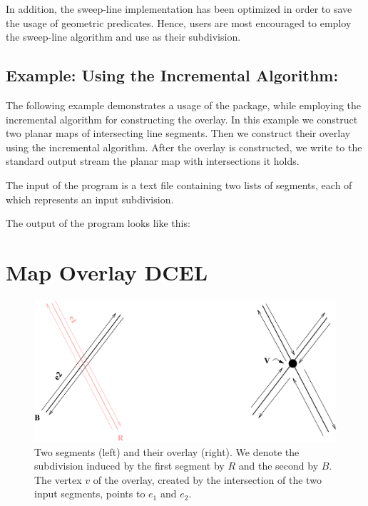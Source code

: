 In addition, the sweep-line implementation has been optimized in order to
save the usage of geometric predicates. 
Hence, users are most encouraged to employ the sweep-line algorithm 
and use  as their subdivision. 

\subsection*{Example: Using the Incremental Algorithm:}
The following example demonstrates a usage of the 
 package, 
while employing the incremental algorithm for constructing the overlay.
In this example we construct two planar maps of intersecting line segments. 
Then we construct their overlay using the incremental algorithm. 
After the overlay is constructed, we write to the standard output stream 
the planar map with intersections it holds. 

The input of the program is a text file containing two lists of segments, 
each of which represents an input subdivision.

The output of the program looks like this:

\section{Map Overlay DCEL}
\label{sec:dcel}

\begin{figure}[h]
    \begin{ccTexOnly}
        \centerline{
           \includegraphics{Map_overlay_2/simple_overlay}
           }
    \end{ccTexOnly}
\caption{Two segments (left) and their overlay (right). 
We denote the subdivision induced by the first segment by $R$ and the second by $B$. 
The vertex $v$ of the overlay, created by the intersection of the two input segments, 
points to $e_1$ and $e_2$.}
\label{fig:simple_overlay_example}
\end{figure}

